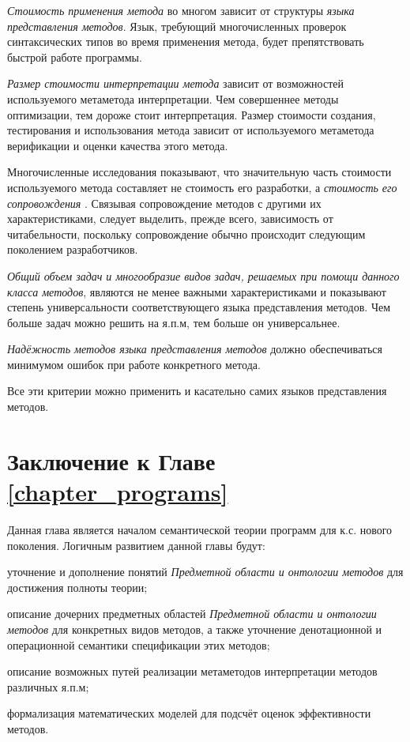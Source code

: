 \textit{Стоимость применения метода} во многом зависит от структуры \textit{языка представления методов}. Язык, требующий многочисленных проверок синтаксических типов во время применения метода, будет препятствовать быстрой работе программы.

\textit{Размер стоимости интерпретации метода} зависит от возможностей используемого метаметода интерпретации. Чем совершеннее методы оптимизации, тем дороже стоит интерпретация.
Размер стоимости создания, тестирования и использования метода зависит от используемого метаметода верификации и оценки качества этого метода.

Многочисленные исследования показывают, что значительную часть стоимости используемого метода составляет не стоимость его разработки, а \textit{стоимость его сопровождения} \cite{Brooks2021}. Связывая сопровождение методов с другими их характеристиками, следует выделить, прежде всего, зависимость от читабельности, поскольку сопровождение обычно происходит следующим поколением разработчиков.

\textit{Общий объем задач и многообразие видов задач, решаемых при помощи данного класса методов}, являются не менее важными характеристиками и показывают степень универсальности соответствующего языка представления методов. Чем больше задач можно решить на я.п.м, тем больше он универсальнее.

\textit{Надёжность методов языка представления методов} должно обеспечиваться минимумом ошибок при работе конкретного метода.

Все эти критерии можно применить и касательно самих языков представления методов.

\section*{Заключение к Главе \ref{chapter_programs}}

Данная глава является началом семантической теории программ для к.с. нового поколения. Логичным развитием данной главы будут:

\begin{textitemize}
    \item уточнение и дополнение понятий \textit{Предметной области и онтологии методов} для достижения полноты теории;
    \item описание дочерних предметных областей \textit{Предметной области и онтологии методов} для конкретных видов методов, а также уточнение денотационной и операционной семантики спецификации этих методов;
    \item описание возможных путей реализации метаметодов интерпретации методов различных я.п.м;
    \item формализация математических моделей для подсчёт оценок эффективности методов.
\end{textitemize}
